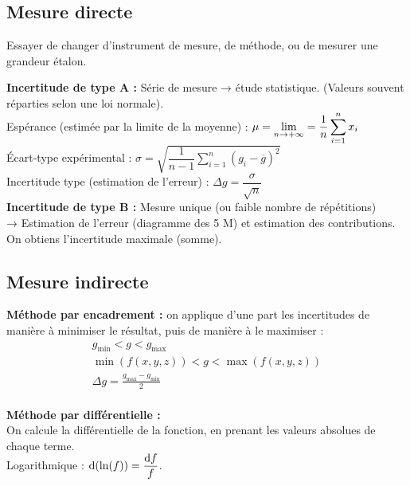 \documentclass[13pt, twoside, a4paper, french]{report}
\begin{document}
    \begin{minipage}[t]{0.65\textwidth}%
      \subsection{Mesure directe}\label{subsec:mesure-directe}

        Essayer de changer d'instrument de mesure, de méthode, ou de mesurer une grandeur étalon.

        \textbf{Incertitude de type A :} Série de mesure → étude statistique. (Valeurs souvent réparties selon une loi normale).\\
        Espérance (estimée par la limite de la moyenne) : $\displaystyle \mu = \lim\limits_{n \to +\infty} = \dfrac{1}{n} \sum_{i=1}^{n} x_i$\\
        Écart-type expérimental : $\displaystyle \sigma = \sqrt{\dfrac{1}{n-1} \sum_{i=1}^{n} (g_i - \overline{g})^2}$\\
        Incertitude type (estimation de l'erreur) : $\Delta g = \dfrac{\sigma}{\sqrt{n}}$\\

        \textbf{Incertitude de type B :} Mesure unique (ou faible nombre de répétitions)\\
        → Estimation de l'erreur (diagramme des 5 M) et estimation des contributions.\\
        On obtiens l'incertitude maximale (somme).

    \end{minipage}\hspace{0.03\textwidth}
    \begin{minipage}[t]{0.32\textwidth}%
      \subsection{Mesure indirecte}\label{subsec:mesure-indirecte}

        \textbf{Méthode par encadrement :} on applique d'une part les incertitudes de manière à minimiser le résultat, puis de manière à le maximiser :
        \begin{gather*}
          g_{\min} < g < g_{\max}\\
          \min(f(x, y, z)) < g < \max(f(x, y, z))\\
          \Delta g = \frac{g_{\max} - g_{\min}}{2}\\
        \end{gather*}

        \textbf{Méthode par différentielle :}\\
          On calcule la différentielle de la fonction, en prenant les valeurs absolues de chaque terme.\\
          Logarithmique : $\textrm d(\ln(f)) = \dfrac{\textrm df}{f}$.

    \end{minipage}
\end{document}
